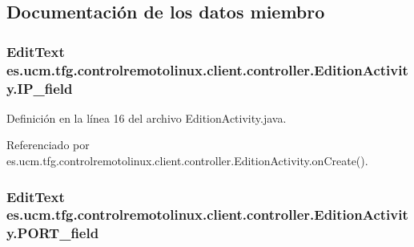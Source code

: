 \subsection{Documentación de los datos miembro}
\hypertarget{classes_1_1ucm_1_1tfg_1_1controlremotolinux_1_1client_1_1controller_1_1EditionActivity_ac3fa85a6c1668243c9fc6703bd38d949}{
\subsubsection[{I\-P\-\_\-field}]{\setlength{\rightskip}{0pt plus 5cm}Edit\-Text es.\-ucm.\-tfg.\-controlremotolinux.\-client.\-controller.\-Edition\-Activity.\-I\-P\-\_\-field\hspace{0.3cm}{\ttfamily [private]}}}\label{classes_1_1ucm_1_1tfg_1_1controlremotolinux_1_1client_1_1controller_1_1EditionActivity_ac3fa85a6c1668243c9fc6703bd38d949}


Definición en la línea 16 del archivo Edition\-Activity.\-java.



Referenciado por es.\-ucm.\-tfg.\-controlremotolinux.\-client.\-controller.\-Edition\-Activity.\-on\-Create().

\hypertarget{classes_1_1ucm_1_1tfg_1_1controlremotolinux_1_1client_1_1controller_1_1EditionActivity_ab46ad3518aec45f6a0c2f7e41e0db0b0}{
\subsubsection[{P\-O\-R\-T\-\_\-field}]{\setlength{\rightskip}{0pt plus 5cm}Edit\-Text es.\-ucm.\-tfg.\-controlremotolinux.\-client.\-controller.\-Edition\-Activity.\-P\-O\-R\-T\-\_\-field\hspace{0.3cm}{\ttfamily [private]}}}\label{classes_1_1ucm_1_1tfg_1_1controlremotolinux_1_1client_1_1controller_1_1EditionActivity_ab46ad3518aec45f6a0c2f7e41e0db0b0}


